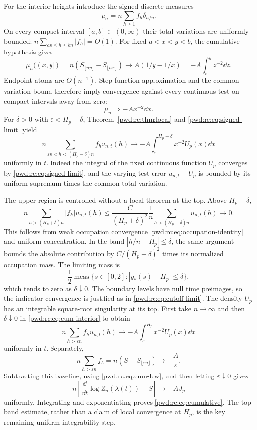 \documentclass[11pt,letterpaper]{article}
\numberwithin{equation}{section}
\theoremstyle{remark}\newtheorem{remark}[theorem]{Remark}
\begin{document}
For the interior heights introduce the signed discrete measures
\[
 \mu_n=n\sum_{h\ge1}f_h\delta_{h/n}.
\]
On every compact interval $[a,b]\subset(0,\infty)$ their total variations are uniformly bounded: $n\sum_{an\le h\le bn}|f_h|=O(1)$. For fixed $a<x<y<b$, the cumulative hypothesis gives
\[
 \mu_n((x,y])=n(S_{\lfloor ny\rfloor}-S_{\lfloor nx\rfloor})
 \longrightarrow A(1/y-1/x)=-A\int_x^y z^{-2}\dd z.
\]
Endpoint atoms are $O(n^{-1})$. Step-function approximation and the common variation bound therefore imply convergence against every continuous test on compact intervals away from zero:
\begin{equation}\label{pwd:rc:eq:signed-limit}
 \mu_n\Longrightarrow -A x^{-2}\dd x.
\end{equation}
For $\delta>0$ with $\varepsilon<H_p-\delta$, Theorem~\ref{pwd:rc:thm:local} and \eqref{pwd:rc:eq:signed-limit} yield
\begin{equation}\label{pwd:rc:eq:cum-interior}
 n\sum_{\varepsilon n<h<(H_p-\delta)n}f_hu_{n,t}(h)
 \longrightarrow-A\int_\varepsilon^{H_p-\delta}x^{-2}U_p(x)\dd x
\end{equation}
uniformly in $t$. Indeed the integral of the fixed continuous function $U_p$ converges by \eqref{pwd:rc:eq:signed-limit}, and the varying-test error $u_{n,t}-U_p$ is bounded by its uniform supremum times the common total variation.

The upper region is controlled without a local theorem at the top. Above $H_p+\delta$,
\[
 n\sum_{h>(H_p+\delta)n}|f_h|u_{n,t}(h)
 \le\frac C{(H_p+\delta)^2}\frac1n
 \sum_{h>(H_p+\delta)n}u_{n,t}(h)\longrightarrow0.
\]
This follows from weak occupation convergence \eqref{pwd:rc:eq:occupation-identity} and uniform concentration. In the band $|h/n-H_p|\le\delta$, the same argument bounds the absolute contribution by $C/(H_p-\delta)^2$ times its normalized occupation mass. The limiting mass is
\[
 \frac12\operatorname{meas}\{s\in[0,2]:|y_*(s)-H_p|\le\delta\},
\]
which tends to zero as $\delta\downarrow0$. The boundary levels have null time preimages, so the indicator convergence is justified as in \eqref{pwd:rc:eq:cutoff-limit}. The density $U_p$ has an integrable square-root singularity at its top. First take $n\to\infty$ and then $\delta\downarrow0$ in \eqref{pwd:rc:eq:cum-interior} to obtain
\[
 n\sum_{h>\varepsilon n}f_hu_{n,t}(h)
 \longrightarrow-A\int_\varepsilon^{H_p}x^{-2}U_p(x)\dd x
\]
uniformly in $t$. Separately,
\[
 n\sum_{h>\varepsilon n}f_h=n(S-S_{\lfloor\varepsilon n\rfloor})
 \longrightarrow-\frac A\varepsilon.
\]
Subtracting this baseline, using \eqref{pwd:rc:eq:cum-low}, and then letting $\varepsilon\downarrow0$ gives
\[
 n\left[\frac{\dd}{\dd t}\log Z_n(\lambda(t))-S\right]\longrightarrow-AJ_p
\]
uniformly. Integrating and exponentiating proves \eqref{pwd:rc:eq:cumulative}. The top-band estimate, rather than a claim of local convergence at $H_p$, is the key remaining uniform-integrability step.
\end{document}
